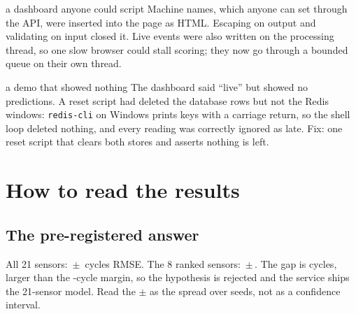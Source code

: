 \documentclass[11pt,a4paper]{article}
\newcommand{\pmsd}[2]{#1\,$\pm$\,#2}
\begin{document}
\begin{mistake}{a dashboard anyone could script}
Machine names, which anyone can set through the API, were inserted into the page as HTML. Escaping on output and
validating on input closed it. Live events were also written on the processing thread, so one slow browser could stall
scoring; they now go through a bounded queue on their own thread.
\end{mistake}
\begin{mistake}{a demo that showed nothing}
The dashboard said ``live'' but showed no predictions. A reset script had deleted the database rows but not the
Redis windows: \texttt{redis-cli} on Windows prints keys with a carriage return, so the shell loop deleted
nothing, and every reading was correctly ignored as late. Fix: one reset script that clears both stores and
asserts nothing is left.
\end{mistake}

\section{How to read the results}\label{sec:read}

\subsection{The pre-registered answer}
\begin{center}
\resizebox{\textwidth}{!}{}
\end{center}
All 21 sensors: \pmsd{\MainGbrFullTwoOneTestRmse}{\MainGbrFullTwoOneTestRmseStd} cycles RMSE. The 8 ranked sensors:
\pmsd{\MainGbrReducedEightTestRmse}{\MainGbrReducedEightTestRmseStd}. The gap is \HypGap{} cycles, larger than the
\Margin{}-cycle margin, so the hypothesis is rejected and the service ships the 21-sensor model. Read the
$\pm$ as the spread over seeds, not as a confidence interval.
\end{document}

